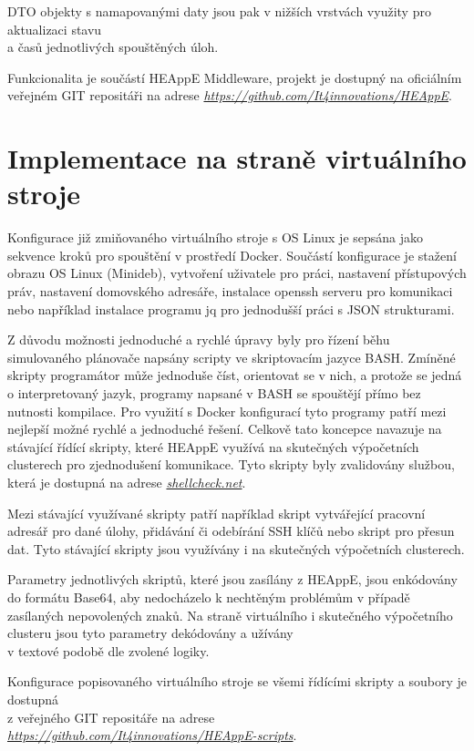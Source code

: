DTO objekty s namapovanými daty jsou pak v nižších vrstvách využity pro aktualizaci stavu \\a časů jednotlivých spouštěných úloh.

Funkcionalita je součástí HEAppE Middleware, projekt je dostupný na oficiálním veřejném GIT repositáři na adrese \emph{\href{https://github.com/It4innovations/HEAppE}{https://github.com/It4innovations/HEAppE}}.

\section{Implementace na straně virtuálního stroje}
Konfigurace již zmiňovaného virtuálního stroje s OS Linux je sepsána jako sekvence kroků pro spouštění v prostředí Docker. Součástí konfigurace je stažení obrazu OS Linux (Minideb), vytvoření uživatele pro práci, nastavení přístupových práv, nastavení domovského adresáře, instalace openssh serveru pro komunikaci nebo například instalace programu jq pro jednodušší práci s JSON strukturami.

Z důvodu možnosti jednoduché a rychlé úpravy byly pro řízení běhu simulovaného plánovače napsány scripty ve skriptovacím jazyce BASH. Zmíněné skripty programátor může jednoduše číst, orientovat se v nich, a protože se jedná o interpretovaný jazyk, programy napsané v BASH se spouštějí přímo bez nutnosti kompilace. Pro využití s Docker konfigurací tyto programy patří mezi nejlepší možné rychlé a jednoduché řešení. Celkově tato koncepce navazuje na stávající řídící skripty, které HEAppE využívá na skutečných výpočetních clusterech pro zjednodušení komunikace. Tyto skripty byly zvalidovány službou, která je dostupná na adrese \emph{\href{https://www.shellcheck.net/}{shellcheck.net}}.

Mezi stávající využívané skripty patří například skript vytvářející pracovní adresář pro dané úlohy, přidávání či odebírání SSH klíčů nebo skript pro přesun dat. Tyto stávající skripty jsou využívány i na skutečných výpočetních clusterech.

Parametry jednotlivých skriptů, které jsou zasílány z HEAppE, jsou enkódovány do formátu Base64, aby nedocházelo k nechtěným problémům v případě zasílaných nepovolených znaků. Na straně virtuálního i skutečného výpočetního clusteru jsou tyto parametry dekódovány a užívány \\v textové podobě dle zvolené logiky.

Konfigurace popisovaného virtuálního stroje se všemi řídícími skripty a soubory je dostupná \\z veřejného GIT repositáře na adrese \emph{\href{https://github.com/It4innovations/HEAppE-scripts}{https://github.com/It4innovations/HEAppE-scripts}}.



